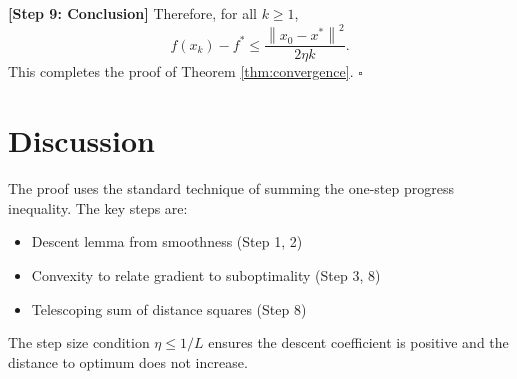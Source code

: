 \documentclass{article}
\newcommand{\norm}[1]{\left\| #1 \right\|}
\newcommand{\step}[1]{\noindent\textbf{[Step #1]}}
\begin{document}
\step{9: Conclusion}
Therefore, for all $k \ge 1$,
\begin{equation}
    f(x_k) - f^* \le \frac{\norm{x_0 - x^*}^2}{2\eta k}.
\end{equation}
This completes the proof of Theorem \ref{thm:convergence}. $\square$

\section{Discussion}

The proof uses the standard technique of summing the one-step progress inequality. The key steps are:
\begin{itemize}
    \item Descent lemma from smoothness (Step 1, 2)
    \item Convexity to relate gradient to suboptimality (Step 3, 8)
    \item Telescoping sum of distance squares (Step 8)
\end{itemize}
The step size condition $\eta \le 1/L$ ensures the descent coefficient is positive and the distance to optimum does not increase.

\end{document}
